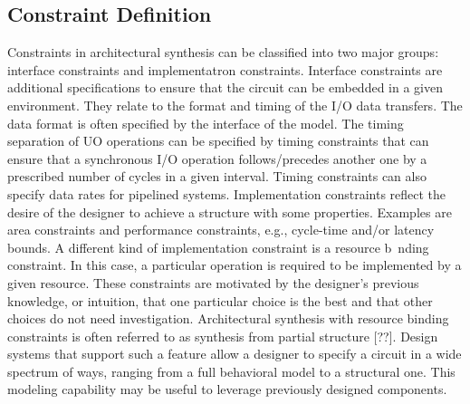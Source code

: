 \subsection{Constraint Definition}

Constraints in architectural synthesis can be classified into two major groups: interface constraints and implementatron constraints. 
Interface constraints are additional specifications to ensure that the circuit can be embedded in a given environment. They relate to the format and timing of the I/O data transfers. The data format is often specified by the interface of the model. The timing separation of UO operations can be specified by timing constraints that can ensure that a synchronous I/O operation follows/precedes another one by a prescribed number of cycles in a given interval. Timing constraints can also specify data rates for pipelined systems. Implementation constraints reflect the desire of the designer to achieve a structure with some properties. Examples are area constraints and performance constraints, e.g., cycle-time and/or latency bounds. 
A different kind of implementation constraint is a resource b~nding constraint. In this case, a particular operation is required to be implemented by a given resource. These constraints are motivated by the designer's previous knowledge, or intuition, that one particular choice is the best and that other choices do not need investigation. Architectural synthesis with resource binding constraints is often referred to as synthesis from partial structure [??]. Design systems that support such a feature allow a designer to specify a circuit in a wide spectrum of ways, ranging from a full behavioral model to a structural one. This modeling capability may be useful to leverage previously designed components. 





